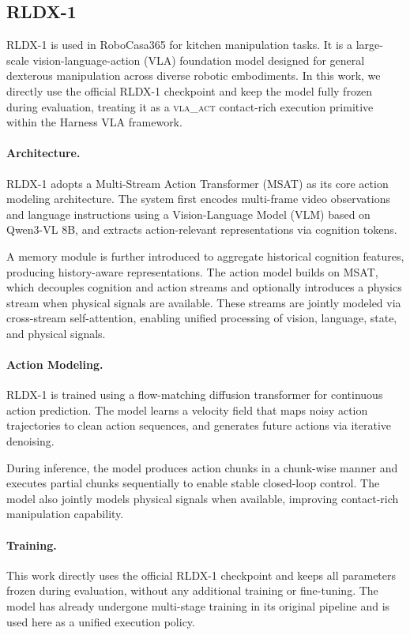 \documentclass[11pt]{article}
\begin{document}
\subsection{RLDX-1}

RLDX-1 is used in RoboCasa365 for kitchen manipulation tasks. It is a large-scale vision-language-action (VLA) foundation model designed for general dexterous manipulation across diverse robotic embodiments. In this work, we directly use the official RLDX-1 checkpoint and keep the model fully frozen during evaluation, treating it as a \textsc{vla\_act} contact-rich execution primitive within the Harness VLA framework.

\paragraph{Architecture.}
RLDX-1 adopts a Multi-Stream Action Transformer (MSAT) as its core action modeling architecture. The system first encodes multi-frame video observations and language instructions using a Vision-Language Model (VLM) based on Qwen3-VL 8B, and extracts action-relevant representations via cognition tokens.

A memory module is further introduced to aggregate historical cognition features, producing history-aware representations. The action model builds on MSAT, which decouples cognition and action streams and optionally introduces a physics stream when physical signals are available. These streams are jointly modeled via cross-stream self-attention, enabling unified processing of vision, language, state, and physical signals.

\paragraph{Action Modeling.}
RLDX-1 is trained using a flow-matching diffusion transformer for continuous action prediction. The model learns a velocity field that maps noisy action trajectories to clean action sequences, and generates future actions via iterative denoising.

During inference, the model produces action chunks in a chunk-wise manner and executes partial chunks sequentially to enable stable closed-loop control. The model also jointly models physical signals when available, improving contact-rich manipulation capability.

\paragraph{Training.}
This work directly uses the official RLDX-1 checkpoint and keeps all parameters frozen during evaluation, without any additional training or fine-tuning. The model has already undergone multi-stage training in its original pipeline and is used here as a unified execution policy.
\end{document}
